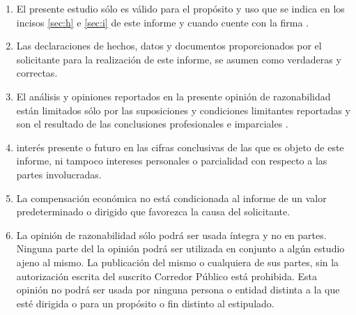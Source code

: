 \begin{enumerate}[1.]
	\item El presente estudio s\'olo es v\'alido para el prop\'osito y uso que se indica en los incisos \ref{sec:h} e \ref{sec:i} de este informe y cuando cuente con la firma .
	\item Las declaraciones de hechos, datos y documentos proporcionados por el solicitante para la realizaci\'on de este informe, se asumen como verdaderas y correctas.
	\item El an\'alisis y opiniones reportados en la presente opini\'on de razonabilidad est\'an limitados s\'olo por las suposiciones y condiciones limitantes reportadas y son el resultado de las conclusiones profesionales e imparciales  .
	\item  {} inter\'es presente o futuro en las cifras conclusivas de las que es objeto de este informe, ni tampoco   intereses personales o parcialidad con respecto a las partes involucradas.
	\item La compensaci\'on econ\'omica   no est\'a condicionada al informe de un valor predeterminado o dirigido que favorezca la causa del solicitante.
	\item La opini\'on de razonabilidad  s\'olo podr\'a ser usada \'integra y no en partes. Ninguna parte del la opini\'on podr\'a ser utilizada en conjunto a alg\'un estudio ajeno al mismo. La publicaci\'on del mismo o cualquiera de sus partes, sin la autorizaci\'on escrita del suscrito Corredor P\'ublico est\'a prohibida. Esta opini\'on no podr\'a ser usada por ninguna persona o entidad distinta a la que est\'e dirigida o para un prop\'osito o fin distinto al estipulado.

\end{enumerate}